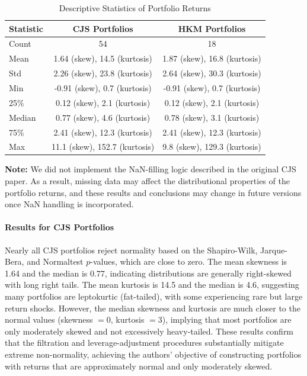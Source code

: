 \documentclass[11pt]{article}
\begin{document}
\begin{table}[H]
  \centering
  \caption{Descriptive Statistics of Portfolio Returns}
  \label{tab:portfolio_stats}
  \begin{tabular}{lcc}
    \toprule
    \textbf{Statistic} & \textbf{CJS Portfolios} & \textbf{HKM Portfolios} \\
    \midrule
    Count   & 54                          & 18                          \\
    Mean    & 1.64 (skew), 14.5 (kurtosis)  & 1.87 (skew), 16.8 (kurtosis) \\
    Std     & 2.26 (skew), 23.8 (kurtosis)  & 2.64 (skew), 30.3 (kurtosis) \\
    Min     & -0.91 (skew), 0.7 (kurtosis)  & -0.91 (skew), 0.7 (kurtosis) \\
    25\%    & 0.12 (skew), 2.1 (kurtosis)   & 0.12 (skew), 2.1 (kurtosis) \\
    \rowcolor{blue!20}
    Median  & 0.77 (skew), 4.6 (kurtosis)   & 0.78 (skew), 3.1 (kurtosis) \\
    75\%    & 2.41 (skew), 12.3 (kurtosis)  & 2.41 (skew), 12.3 (kurtosis) \\
    Max     & 11.1 (skew), 152.7 (kurtosis) & 9.8 (skew), 129.3 (kurtosis) \\
    \bottomrule
  \end{tabular}
\end{table}

\textbf{Note:} We did not implement the NaN-filling logic described in the original CJS paper. As a result, missing data may affect the distributional properties of the portfolio returns, and these results and conclusions may change in future versions once NaN handling is incorporated.

\paragraph{Results for CJS Portfolios}

Nearly all CJS portfolios reject normality based on the Shapiro-Wilk, Jarque-Bera, and Normaltest $p$-values, which are close to zero. The mean skewness is 1.64 and the median is 0.77, indicating distributions are generally right-skewed with long right tails. The mean kurtosis is 14.5 and the median is 4.6, suggesting many portfolios are leptokurtic (fat-tailed), with some experiencing rare but large return shocks. However, the median skewness and kurtosis are much closer to the normal values (skewness $=0$, kurtosis $=3$), implying that most portfolios are only moderately skewed and not excessively heavy-tailed. These results confirm that the filtration and leverage-adjustment procedures substantially mitigate extreme non-normality, achieving the authors' objective of constructing portfolios with returns that are approximately normal and only moderately skewed.
\end{document}
